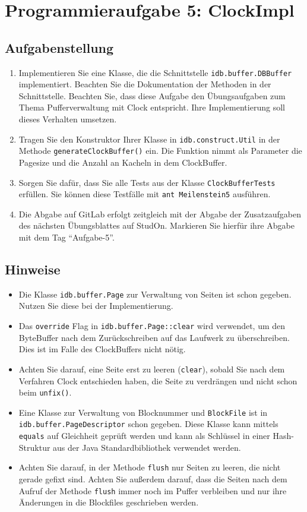 \section{Programmieraufgabe 5: ClockImpl}

\subsection{Aufgabenstellung}
\begin{enumerate}
	\item Implementieren Sie eine Klasse, die die Schnittstelle \beamertxt{\linebreak}\texttt{idb.buffer.DBBuffer} implementiert.
		Beachten Sie die Dokumentation der Methoden in der Schnittstelle. Beachten Sie, dass diese Aufgabe den Übungsaufgaben zum Thema Pufferverwaltung mit Clock entspricht.
		Ihre Implementierung soll dieses Verhalten umsetzen.
	\item Tragen Sie den Konstruktor Ihrer Klasse in \texttt{idb.construct.Util} in der Methode \texttt{generateClockBuffer()} ein.
		Die Funktion nimmt als Parameter die Pagesize und die Anzahl an Kacheln in dem ClockBuffer.
	\item Sorgen Sie dafür, dass Sie alle Tests aus der Klasse \texttt{ClockBufferTests} erfüllen.
	Sie können diese Testfälle mit \lstinline|ant Meilenstein5| ausführen.
	\item Die Abgabe auf GitLab erfolgt zeitgleich mit der Abgabe der Zusatzaufgaben des nächsten Übungsblattes auf StudOn. Markieren Sie hierfür ihre Abgabe mit dem Tag "`Aufgabe-5"'.
\end{enumerate}

\subsection{Hinweise}
\begin{itemize}
	\item Die Klasse \texttt{idb.buffer.Page} zur Verwaltung von Seiten ist schon gegeben. Nutzen Sie diese bei der Implementierung.
	\item Das \texttt{override} Flag in \texttt{idb.buffer.Page::clear} wird verwendet, um den ByteBuffer nach dem Zurückschreiben auf das Laufwerk zu überschreiben.
		Dies ist im Falle des ClockBuffers nicht nötig.
	\item Achten Sie darauf, eine Seite erst zu leeren (\texttt{clear}), sobald Sie nach dem Verfahren Clock entschieden haben, die Seite zu verdrängen und nicht schon beim \texttt{unfix()}.
	\item Eine Klasse zur Verwaltung von Blocknummer und \texttt{BlockFile} ist in \texttt{idb.buffer.PageDescriptor} schon gegeben. Diese Klasse kann mittels \texttt{equals} auf Gleichheit geprüft werden und kann als Schlüssel in einer Hash-Struktur aus der Java Standardbibliothek verwendet werden.
	\item Achten Sie darauf, in der Methode \texttt{flush} nur Seiten zu leeren, die nicht gerade gefixt sind. Achten Sie außerdem darauf, dass die Seiten nach dem Aufruf der Methode \texttt{flush} immer noch im Puffer verbleiben und nur ihre Änderungen in die Blockfiles geschrieben werden.
\end{itemize}
